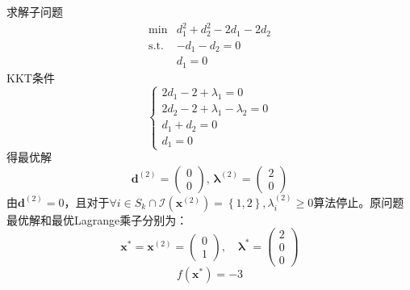 \begin{example}
\begin{solution}
        求解子问题
        \[
            \begin{array}{rl}
                \operatorname*{min}&d_{1}^{2}+d_{2}^{2}-2d_{1}-2d_{2}\\
                \mathrm{s.t.}&-d_{1}-d_2=0\\
                &d_1 = 0
            \end{array}
        \]
        KKT条件
        \[
            \left\{
                \begin{array}{l}
                    2d_1-2+\lambda_1 = 0\\
                    2d_2-2+\lambda_1-\lambda_2 = 0\\
                    d_1+d_2 = 0\\
                    d_1 = 0
                \end{array}
            \right.
        \]
        得最优解
        \[
            \boldsymbol{d}^{(2)}=\begin{pmatrix}0\\0\end{pmatrix},\,\boldsymbol{\lambda}^{(2)}=\begin{pmatrix}2\\0\end{pmatrix}
        \] 
        由$\boldsymbol{d}^{(2)}=0$，且对于$\forall i\in S_{k}\cap \mathcal{I}(\boldsymbol{x}^{(2)}) = \left\{ 1,2 \right\},\lambda_{i}^{(2)}\geqslant 0$算法停止。原问题最优解和最优Lagrange乘子分别为：
        \[
            \boldsymbol{x}^*=\boldsymbol{x}^{(2)}=\begin{pmatrix}0\\1\end{pmatrix},\quad 
            \boldsymbol{\lambda}^* = \begin{pmatrix}
                2\\0\\0
            \end{pmatrix}
        \]
        \[
            f(\boldsymbol{x}^{*}) = -3
        \]
    \end{solution}
\end{example}
